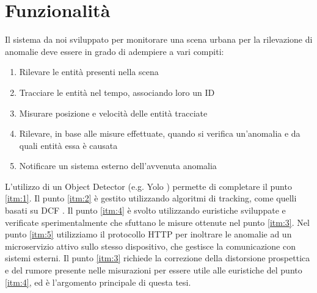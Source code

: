 \chapter{Funzionalità}
\label{sec:funzionalita}

Il sistema da noi sviluppato per monitorare una scena urbana per la rilevazione di anomalie deve essere in grado di adempiere a vari compiti:
\begin{enumerate}
    \item \label{itm:1} Rilevare le entità presenti nella scena
    \item \label{itm:2} Tracciare le entità nel tempo, associando loro un ID
    \item \label{itm:3} Misurare posizione e velocità delle entità tracciate
    \item \label{itm:4} Rilevare, in base alle misure effettuate, quando si verifica un'anomalia e da quali entità essa è causata
    \item \label{itm:5} Notificare un sistema esterno dell'avvenuta anomalia
\end{enumerate}

L'utilizzo di un Object Detector (e.g. Yolo \cite{arch:yolo}) permette di completare il punto \ref{itm:1}.
Il punto \ref{itm:2} è gestito utilizzando algoritmi di tracking, come quelli basati su DCF \cite{dcf}.
Il punto \ref{itm:4} è svolto utilizzando euristiche sviluppate e verificate sperimentalmente che sfuttano le misure ottenute nel punto \ref{itm:3}. 
Nel punto \ref{itm:5} utilizziamo il protocollo HTTP per inoltrare le anomalie ad un microservizio attivo sullo stesso dispositivo, che gestisce la comunicazione con sistemi esterni.
Il punto \ref{itm:3} richiede la correzione della distorsione prospettica e del rumore presente nelle misurazioni per essere utile alle euristiche del punto \ref{itm:4}, ed è l'argomento principale di questa tesi.

